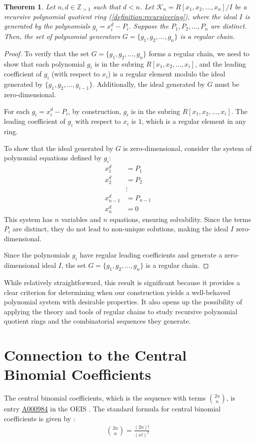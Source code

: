 \documentclass[12pt,reqno]{article}
\theoremstyle{plain}
\newtheorem{theorem}{Theorem}
\newcommand{\K}{\mathcal{K}}
\newcommand{\seqnum}[1]{\href{https://oeis.org/#1}{\rm \underline{#1}}}
\begin{document}
\begin{theorem} \label{proof:regularchain}
Let $n,d \in \mathbb{Z}_{>1}$ such that $d < n$. Let $\K_n = R[x_1, x_2, \ldots, x_n]/I$ be a recursive polynomial quotient ring (\cref{definition:recursivering}), where the ideal $I$ is generated by the polynomials $g_i = x_i^d - P_i$. Suppose the $P_1, P_2, \ldots, P_n$ are distinct. Then, the set of polynomial generators $G = \{ g_1, g_2, \ldots, g_n \}$ is a regular chain.
\end{theorem}
\begin{proof}
To verify that the set $G = \{ g_1, g_2, \ldots, g_n \}$ forms a regular chain, we need to show that each polynomial $g_i$ is in the subring $R[x_1, x_2, \ldots, x_i]$, and the leading coefficient of $g_i$ (with respect to $x_i$) is a regular element modulo the ideal generated by $\{ g_1, g_2, \ldots, g_{i-1} \}$. Additionally, the ideal generated by $G$ must be zero-dimensional.

For each $g_i = x_i^d - P_i$, by construction, $g_i$ is in the subring $R[x_1, x_2, \ldots, x_i]$. The leading coefficient of $g_i$ with respect to $x_i$ is $1$, which is a regular element in any ring.

To show that the ideal generated by $G$ is zero-dimensional, consider the system of polynomial equations defined by $g_i$:
\begin{align*}
    x_1^d &= P_1 \\
    x_2^d &= P_2 \\
    &\vdots \\
    x_{n-1}^d &= P_{n-1} \\
    x_n^d &= 0
\end{align*}
This system has $n$ variables and $n$ equations, ensuring solvability. Since the terms $P_i$ are distinct, they do not lead to non-unique solutions, making the ideal $I$ zero-dimensional.

Since the polynomials $g_i$ have regular leading coefficients and generate a zero-dimensional ideal $I$, the set $G = \{g_1, g_2, \ldots, g_n\}$ is a regular chain.
\end{proof}
While relatively straightforward, this result is significant because it provides a clear criterion for determining when our construction yields a well-behaved polynomial system with desirable properties. It also opens up the possibility of applying the theory and tools of regular chains to study recursive polynomial quotient rings and the combinatorial sequences they generate.

\section{Connection to the Central Binomial Coefficients} \label{section:cbc}
The central binomial coefficients, which is the sequence with terms $\binom{2n}{n}$, is entry \seqnum{A000984} in the OEIS \cite{A000984}. The standard formula for central binomial coefficients is given by \cite{A000984}:
\begin{align*}
    \binom{2n}{n} = \frac{(2n)!}{(n!)^2} 
\end{align*}
\end{document}
